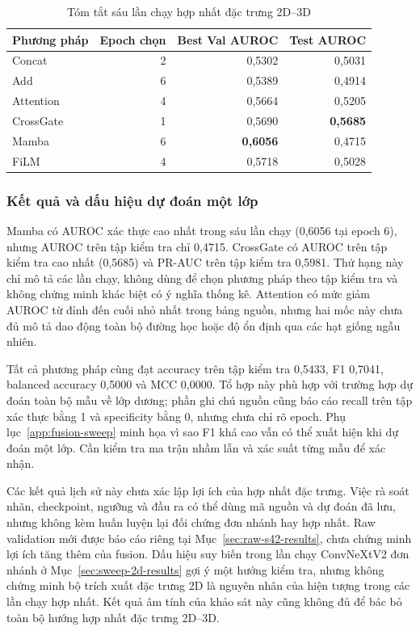 \documentclass[14pt,a4paper,oneside]{extreport}
\begin{document}
\begin{table}[htbp]
  \centering
  \caption{Tóm tắt sáu lần chạy hợp nhất đặc trưng 2D--3D}
  \label{tab:fusion-summary}
  \setlength{\tabcolsep}{6pt}
  \begin{tabular}{@{}lrrr@{}}
    \toprule
    Phương pháp & Epoch chọn & Best Val AUROC & Test AUROC\\
    \midrule
    Concat & 2 & 0,5302 & 0,5031\\
    Add & 6 & 0,5389 & 0,4914\\
    Attention & 4 & 0,5664 & 0,5205\\
    CrossGate & 1 & 0,5690 & \textbf{0,5685}\\
    Mamba & 6 & \textbf{0,6056} & 0,4715\\
    FiLM & 4 & 0,5718 & 0,5028\\
    \bottomrule
  \end{tabular}
\end{table}

\subsubsection{Kết quả và dấu hiệu dự đoán một lớp}
Mamba có AUROC xác thực cao nhất trong sáu lần chạy (0,6056 tại epoch 6),
nhưng AUROC trên tập kiểm tra chỉ 0,4715. CrossGate có AUROC trên tập kiểm tra cao nhất
(0,5685) và PR-AUC trên tập kiểm tra 0,5981. Thứ hạng này chỉ mô tả các lần chạy,
không dùng để chọn phương pháp theo tập kiểm tra và không chứng minh khác
biệt có ý nghĩa thống kê. Attention có mức giảm AUROC từ đỉnh đến
cuối nhỏ nhất trong bảng nguồn, nhưng hai mốc này chưa đủ mô tả
dao động toàn bộ đường học hoặc độ ổn định qua các hạt giống ngẫu nhiên.

Tất cả phương pháp cùng đạt accuracy trên tập kiểm tra 0,5433, F1 0,7041,
balanced accuracy 0,5000 và MCC 0,0000. Tổ hợp này phù hợp với
trường hợp dự đoán toàn bộ mẫu về lớp dương; phần ghi chú nguồn
cũng báo cáo recall trên tập xác thực bằng 1 và specificity bằng 0,
nhưng chưa chỉ rõ epoch. Phụ lục~\ref{app:fusion-sweep} minh họa
vì sao F1 khá cao vẫn có thể xuất hiện khi dự đoán một lớp.
Cần kiểm tra ma trận nhầm lẫn và xác suất từng mẫu để xác nhận.

Các kết quả lịch sử này chưa xác lập lợi ích của hợp nhất đặc trưng.
Việc rà soát nhãn, checkpoint, ngưỡng và đầu ra có thể dùng mã nguồn
và dự đoán đã lưu, nhưng không kèm huấn luyện lại đối chứng đơn nhánh
hay hợp nhất. Raw validation mới được báo cáo riêng tại
Mục~\ref{sec:raw-s42-results}, chưa chứng minh lợi ích tăng thêm của fusion.
Dấu hiệu suy biến trong lần chạy ConvNeXtV2 đơn nhánh ở Mục~\ref{sec:sweep-2d-results}
gợi ý một hướng kiểm tra, nhưng không chứng minh bộ trích xuất đặc trưng 2D là nguyên nhân
của hiện tượng trong các lần chạy hợp nhất. Kết quả âm tính của khảo sát
này cũng không đủ để bác bỏ toàn bộ hướng hợp nhất đặc trưng 2D--3D.
\FloatBarrier
\end{document}
